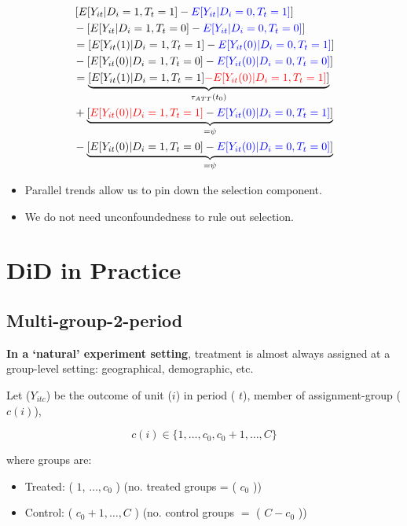 \documentclass[
  letterpaper,
  DIV=11,
  numbers=noendperiod]{scrreprt}
\providecommand{\tightlist}{%
  \setlength{\itemsep}{0pt}\setlength{\parskip}{0pt}}\usepackage{longtable,booktabs,array}
\theoremstyle{definition}
\theoremstyle{remark}
\begin{document}
\begin{enumerate}
  \[
  \begin{aligned}
  &\left[E[Y_{it}|D_i=1,T_t=1] - \textcolor{blue}{E[Y_{it}|D_i=0,T_t=1]}\right] \\
  &- \left[E[Y_{it}|D_i=1,T_t=0] - \textcolor{blue}{E[Y_{it}|D_i=0,T_t=0]}\right] \\
  &= \left[E[Y_{it}(1)|D_i=1,T_t=1] - \textcolor{blue}{E[Y_{it}(0)|D_i=0,T_t=1]}\right] \\
  &- \left[E[Y_{it}(0)|D_i=1,T_t=0] - \textcolor{blue}{E[Y_{it}(0)|D_i=0,T_t=0]}\right] \\
  &= \underbrace{\left[E[Y_{it}(1)|D_i=1,T_t=1] \textcolor{red}{- E[Y_{it}(0)|D_i=1,T_t=1]}\right]}_{\tau_{ATT}(t_0)} \\
  &+ \underbrace{\left[\textcolor{red}{E[Y_{it}(0)|D_i=1,T_t=1]} - \textcolor{blue}{E[Y_{it}(0)|D_i=0,T_t=1]}\right]}_{= \psi} \\
  &- \underbrace{\left[E[Y_{it}(0)|D_i=1,T_t=0] - \textcolor{blue}{E[Y_{it}(0)|D_i=0,T_t=0]}\right]}_{= \psi}
  \end{aligned}
  \]

  \begin{itemize}
  \tightlist
  \item
    Parallel trends allow us to pin down the selection component.
  \item
    We do not need unconfoundedness to rule out selection.
  \end{itemize}

  \section{DiD in Practice}\label{did-in-practice}

  \subsection{Multi-group-2-period}\label{multi-group-2-period}

  \textbf{In a `natural' experiment setting}, treatment is almost always
  assigned at a group-level setting: geographical, demographic, etc.

  Let (\(Y_{itc}\)) be the outcome of unit (\(i\)) in period ( \(t\)),
  member of assignment-group (\(c(i)\)),

  \[
  c(i) \in \{1, \ldots, c_0, c_0 + 1, \ldots, C\}
  \]

  where groups are:

  \begin{itemize}
  \tightlist
  \item
    Treated: ( \(1\), \(\ldots, c_0\) ) (no. treated groups = ( \(c_0\)
    ))
  \item
    Control: ( \(c_0 + 1, \ldots, C\) ) (no. control groups \(=\) (
    \(C - c_0\) ))
  \end{itemize}


\end{enumerate}
\end{document}
